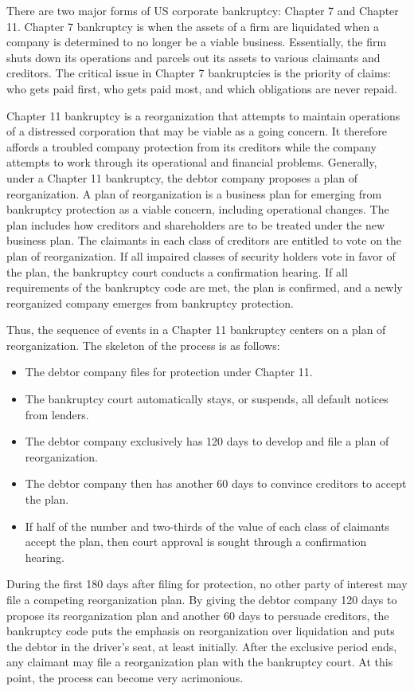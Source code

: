\documentclass[11pt]{article}
\begin{document}
There are two major forms of US corporate bankruptcy: Chapter 7 and Chapter 11. Chapter 7 bankruptcy is when the assets of a firm are liquidated when a company is determined to no longer be a viable business. Essentially, the firm shuts down its operations and parcels out its assets to various claimants and creditors. The critical issue in Chapter 7 bankruptcies is the priority of claims: who gets paid first, who gets paid most, and which obligations are never repaid.

Chapter 11 bankruptcy is a reorganization that attempts to maintain operations of a distressed corporation that may be viable as a going concern. It therefore affords a troubled company protection from its creditors while the company attempts to work through its operational and financial problems. Generally, under a Chapter 11 bankruptcy, the debtor company proposes a plan of reorganization. A plan of reorganization is a business plan for emerging from bankruptcy protection as a viable concern, including operational changes. The plan includes how creditors and shareholders are to be treated under the new business plan. The claimants in each class of creditors are entitled to vote on the plan of reorganization. If all impaired classes of security holders vote in favor of the plan, the bankruptcy court conducts a confirmation hearing. If all requirements of the bankruptcy code are met, the plan is confirmed, and a newly reorganized company emerges from bankruptcy protection.

Thus, the sequence of events in a Chapter 11 bankruptcy centers on a plan of reorganization. The skeleton of the process is as follows:

\begin{itemize}
  \item The debtor company files for protection under Chapter 11.
  \item The bankruptcy court automatically stays, or suspends, all default notices from lenders.
  \item The debtor company exclusively has 120 days to develop and file a plan of reorganization.
  \item The debtor company then has another 60 days to convince creditors to accept the plan.
  \item If half of the number and two-thirds of the value of each class of claimants accept the plan, then court approval is sought through a confirmation hearing.
\end{itemize}

During the first 180 days after filing for protection, no other party of interest may file a competing reorganization plan. By giving the debtor company 120 days to propose its reorganization plan and another 60 days to persuade creditors, the bankruptcy code puts the emphasis on reorganization over liquidation and puts the debtor in the driver's seat, at least initially. After the exclusive period ends, any claimant may file a reorganization plan with the bankruptcy court. At this point, the process can become very acrimonious.
\end{document}
